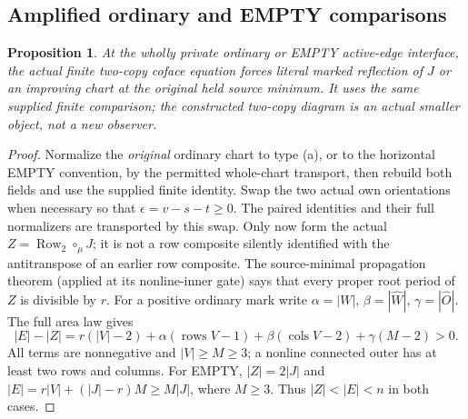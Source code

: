 \documentclass[11pt,a4paper]{amsart}
\numberwithin{equation}{section}
\theoremstyle{plain}
\newtheorem{proposition}[theorem]{Proposition}
\theoremstyle{definition}
\newcommand{\Row}{\operatorname{Row}}
\begin{document}
\subsection{Amplified ordinary and EMPTY comparisons}

\begin{proposition}\label{ge:ordinary-amplified}
At the wholly private ordinary or EMPTY active-edge interface, the actual
finite two-copy coface equation forces literal marked reflection of \(J\)
or an improving chart at the original held source minimum.  It uses the
same supplied finite comparison; the constructed two-copy diagram is an
actual smaller object, not a new observer.
\end{proposition}
\begin{proof}
Normalize the \emph{original} ordinary chart to type (a), or to the
horizontal EMPTY convention, by the permitted whole-chart transport,
then rebuild both fields and use the supplied finite identity.
Swap the two actual own orientations when necessary so that
\(\epsilon=v-s-t\ge0\).  The paired identities and their full
normalizers are transported by this swap.  Only now form the actual
\(Z=\Row_2\circ_\mu J\); it is not a row composite silently
identified with the antitranspose of an earlier row composite.  The source-minimal propagation theorem
\cite[Outer-independent minimality lemma]{Shields2026CornerDescent}
(applied at its nonline-inner gate) says that every proper root period
of \(Z\) is divisible by \(r\).  For a positive ordinary mark write
\(\alpha=|W|\), \(\beta=|\widehat W|\),
\(\gamma=|\widehat O|\).  The full area law gives
\[
 |E|-|Z|=r(|V|-2)+\alpha(\operatorname{rows}V-1)
       +\beta(\operatorname{cols}V-2)+\gamma(M-2)>0.
\]
All terms are nonnegative and \(|V|\ge M\ge3\); a nonline
connected outer has at least two rows and columns.  For EMPTY,
\(|Z|=2|J|\) and
\(|E|=r|V|+(|J|-r)M\ge M|J|\), where \(M\ge3\).
Thus \(|Z|<|E|<n\) in both cases.


\end{proof}
\end{document}
